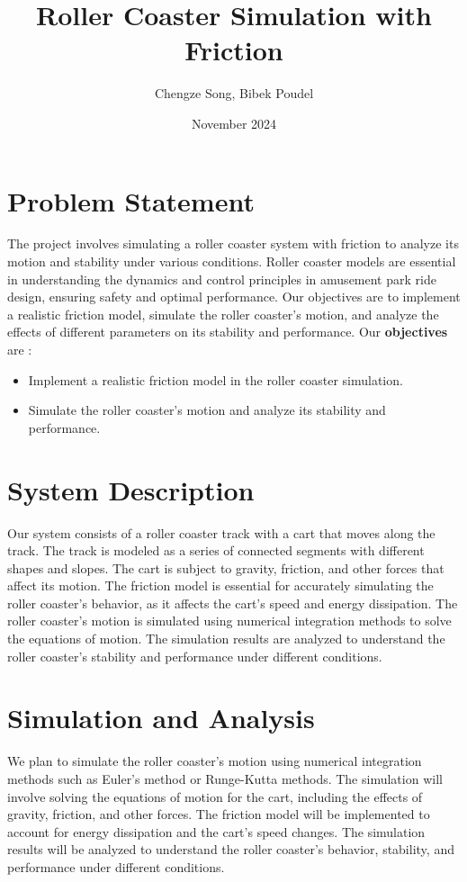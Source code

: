 \documentclass[12pt]{article}
\title{Roller Coaster Simulation with Friction}
\author{Chengze Song, Bibek Poudel}
\date{November 2024}
\begin{document}
\maketitle

\section*{Problem Statement}
The project involves simulating a roller coaster system with friction to analyze its motion and stability under various conditions. Roller coaster models are essential in understanding the dynamics and control principles in amusement park ride design, ensuring safety and optimal performance. Our objectives are to implement a realistic friction model, simulate the roller coaster's motion, and analyze the effects of different parameters on its stability and performance. Our \textbf{objectives} are :
\begin{itemize}
    \item Implement a realistic friction model in the roller coaster simulation.
    \item Simulate the roller coaster's motion and analyze its stability and performance.
\end{itemize}

\section*{System Description}
Our system consists of a roller coaster track with a cart that moves along the track. The track is modeled as a series of connected segments with different shapes and slopes. The cart is subject to gravity, friction, and other forces that affect its motion. The friction model is essential for accurately simulating the roller coaster's behavior, as it affects the cart's speed and energy dissipation. The roller coaster's motion is simulated using numerical integration methods to solve the equations of motion. The simulation results are analyzed to understand the roller coaster's stability and performance under different conditions.

\section*{Simulation and Analysis}
We plan to simulate the roller coaster's motion using numerical integration methods such as Euler's method or Runge-Kutta methods. The simulation will involve solving the equations of motion for the cart, including the effects of gravity, friction, and other forces. The friction model will be implemented to account for energy dissipation and the cart's speed changes. The simulation results will be analyzed to understand the roller coaster's behavior, stability, and performance under different conditions.
\end{document}
